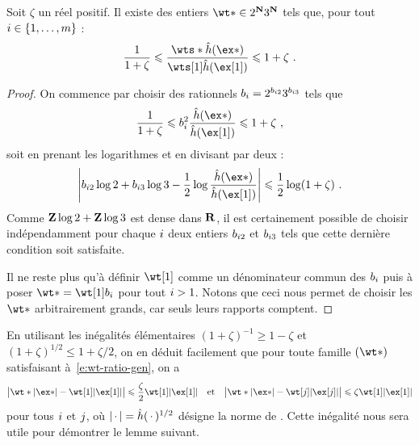 \begin{lem} \label{l:wt-choose-gen}
  Soit \( \zeta \) un réel positif. Il existe des entiers \( \wt* \in 2^\N
    3^\N \) tels que, pour tout \( i \in \lbrace1, \dots, m\rbrace \) :
  \begin{equation} \label{e:wt-ratio-gen}
    \frac1{1 + \zeta}
    \le
    \frac{ \wts* \hautn{\ex*} }{ \wts[1] \hautn{\ex[1]} }
    \le
    1 + \zeta
    \pmm.
  \end{equation}
\end{lem}

\begin{proof}
  On commence par choisir des rationnels \( b_i = 2^{b_{i2}}
    3^{b_{i3}} \) tels que
  \begin{equation}
    \frac1{1 + \zeta}
    \le
    b_\fct^2 \frac{ \hautn{\ex*} }{ \hautn{\ex[1]} }
    \le
    1 + \zeta
    \pmm,
  \end{equation}
  soit en prenant les logarithmes et en divisant par deux :
  \begin{equation}
    \abs*{
      b_{\fct2} \log 2 + b_{\fct3} \log 3
      - \frac12 \log \frac{ \hautn{\ex*} }{ \hautn{\ex[1]} }
    }
    \le
    \frac12 \log (1 + \zeta)
    \pmm.
  \end{equation}
  Comme \( {\mathbf{Z}} \log2 + {\mathbf{Z}} \log 3 \) est dense dans \( {\mathbf{R}} \), il est
  certainement possible de choisir indépendamment pour chaque \( i \) deux
  entiers \( b_{i2} \) et \( b_{i3} \) tels que cette dernière condition
  soit satisfaite.

  Il ne reste plus qu'à définir \( \wt[1] \) comme un dénominateur commun des
  \( b_i \) puis à poser \( \wt* = \wt[1] b_\fct \) pour tout \( i > 1
  \). Notons que ceci nous permet de choisir les \( \wt* \) arbitrairement
  grands, car seuls leurs rapports comptent.
\end{proof}

En utilisant les inégalités élémentaires \( (1 + \zeta)^{-1} \ge 1 - \zeta \)
et \( (1 + \zeta)^{1/2} \le 1 + \zeta/2 \), on en déduit facilement que pour
toute famille \( (\wt*) \) satisfaisant à~\eqref{e:wt-ratio-gen}, on a
\begin{equation} \label{e:wt-diff-nnt-gen}
  \abs[\big]{ \wt* \nnt{\ex*} - \wt[1] \nnt{\ex[1]} }
  \le
  \frac\zeta2 \wt[1] \nnt{\ex[1]}
  \quad\text{et}\quad
  \abs[\big]{ \wt* \nnt{\ex*} - \wt[\fcti] \nnt{\ex[\fcti]} }
  \le
  \zeta \wt[1] \nnt{\ex[1]}
\end{equation}
pour tous \( i \) et \( j \), où \( \lvert{\,\cdot\,}\rvert = \hat h ({\,\cdot\,})^{1/2} \)
désigne la norme de \NT. Cette inégalité nous sera utile pour démontrer le
lemme suivant.

